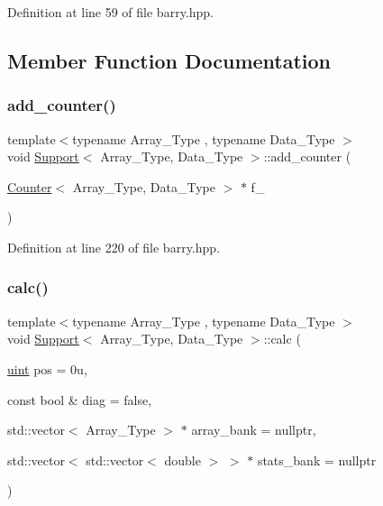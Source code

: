 Definition at line 59 of file barry.\+hpp.



\subsection{Member Function Documentation}
\mbox{\label{classbarry_1_1_support_a0ad8bb6202451253697d771a28859210}} 
\subsubsection{\texorpdfstring{add\+\_\+counter()}{add\_counter()}}
{\footnotesize\ttfamily template$<$typename Array\+\_\+\+Type , typename Data\+\_\+\+Type $>$ \\
void \hyperlink{classbarry_1_1_support}{Support}$<$ Array\+\_\+\+Type, Data\+\_\+\+Type $>$\+::add\+\_\+counter (\begin{DoxyParamCaption}\item[{\hyperlink{classbarry_1_1_counter}{Counter}$<$ Array\+\_\+\+Type, Data\+\_\+\+Type $>$ $\ast$}]{f\+\_\+ }\end{DoxyParamCaption})\hspace{0.3cm}{\ttfamily [inline]}}



Definition at line 220 of file barry.\+hpp.

\mbox{\label{classbarry_1_1_support_ab5261952be0746f188ee024e3e8c26c1}} 
\subsubsection{\texorpdfstring{calc()}{calc()}}
{\footnotesize\ttfamily template$<$typename Array\+\_\+\+Type , typename Data\+\_\+\+Type $>$ \\
void \hyperlink{classbarry_1_1_support}{Support}$<$ Array\+\_\+\+Type, Data\+\_\+\+Type $>$\+::calc (\begin{DoxyParamCaption}\item[{\hyperlink{namespacebarry_a11dfc53ddb4672278319aa04f1e09a6c}{uint}}]{pos = {\ttfamily 0u},  }\item[{const bool \&}]{diag = {\ttfamily false},  }\item[{std\+::vector$<$ Array\+\_\+\+Type $>$ $\ast$}]{array\+\_\+bank = {\ttfamily nullptr},  }\item[{std\+::vector$<$ std\+::vector$<$ double $>$ $>$ $\ast$}]{stats\+\_\+bank = {\ttfamily nullptr} }\end{DoxyParamCaption})\hspace{0.3cm}{\ttfamily [inline]}}



